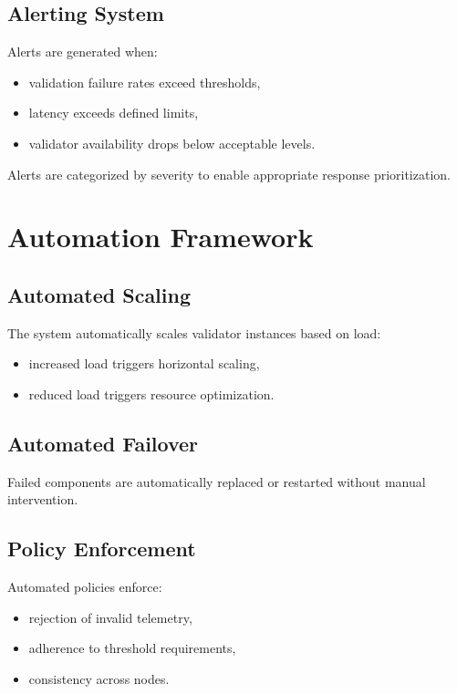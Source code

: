 \subsection{Alerting System}

Alerts are generated when:
\begin{itemize}
\item validation failure rates exceed thresholds,
\item latency exceeds defined limits,
\item validator availability drops below acceptable levels.
\end{itemize}

Alerts are categorized by severity to enable appropriate response prioritization.

\section{Automation Framework}

\subsection{Automated Scaling}

The system automatically scales validator instances based on load:

\begin{itemize}
\item increased load triggers horizontal scaling,
\item reduced load triggers resource optimization.
\end{itemize}

\subsection{Automated Failover}

Failed components are automatically replaced or restarted without manual intervention.

\subsection{Policy Enforcement}

Automated policies enforce:
\begin{itemize}
\item rejection of invalid telemetry,
\item adherence to threshold requirements,
\item consistency across nodes.
\end{itemize}

